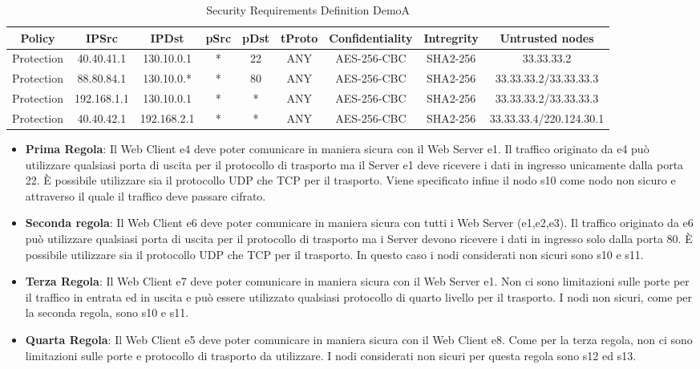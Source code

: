 \begin{table}[H]
    \centering
    \small
    \setlength{\tabcolsep}{1pt} %
    \begin{tabular}{ccccccccc}
        \hline
         Policy & IPSrc & IPDst & pSrc & pDst & tProto & Confidentiality & Intregrity & Untrusted nodes\\
        \hline
        Protection & 40.40.41.1 & 130.10.0.1 & * & 22 & ANY & AES-256-CBC & SHA2-256 & 33.33.33.2 \\
        Protection & 88.80.84.1 & 130.10.0.* & * & 80 & ANY & AES-256-CBC & SHA2-256 & 33.33.33.2/33.33.33.3 \\
        Protection & 192.168.1.1 & 130.10.0.1 & * & * & ANY & AES-256-CBC & SHA2-256 & 33.33.33.2/33.33.33.3 \\
        Protection & 40.40.42.1 & 192.168.2.1 & * & * & ANY & AES-256-CBC & SHA2-256 & 33.33.33.4/220.124.30.1 \\
        \hline
    \end{tabular}
    \caption{Security Requirements Definition DemoA}
    \label{tab:tabella}
\end{table}
\begin{itemize}
    \item \textbf{Prima Regola}: Il Web Client e4 deve poter comunicare in maniera sicura con il Web Server e1. Il traffico originato da e4 può utilizzare qualsiasi porta di uscita per il protocollo di trasporto ma il Server e1 deve ricevere i dati in ingresso unicamente dalla porta 22. È possibile utilizzare sia il protocollo UDP che TCP per il trasporto. Viene specificato infine il nodo s10 come nodo non sicuro e attraverso il quale il traffico deve passare cifrato.
    \item \textbf{Seconda regola}: Il Web Client e6 deve poter comunicare in maniera sicura con tutti i Web Server (e1,e2,e3). Il traffico originato da e6 può utilizzare qualsiasi porta di uscita per il protocollo di trasporto ma i Server devono ricevere i dati in ingresso solo dalla porta 80. È possibile utilizzare sia il protocollo UDP che TCP per il trasporto. In questo caso i nodi considerati non sicuri sono s10 e s11.
    \item \textbf{Terza Regola}: Il Web Client e7 deve poter comunicare in maniera sicura con il Web Server e1. Non ci sono limitazioni sulle porte per il traffico in entrata ed in uscita e può essere utilizzato qualsiasi protocollo di quarto livello per il trasporto. I nodi non sicuri, come per la seconda regola, sono s10 e s11. 
    \item \textbf{Quarta Regola}: Il Web Client e5 deve poter comunicare in maniera sicura con il Web Client e8. Come per la terza regola, non ci sono limitazioni sulle porte e protocollo di trasporto da utilizzare. I nodi considerati non sicuri per questa regola sono s12 ed s13.
\end{itemize}

